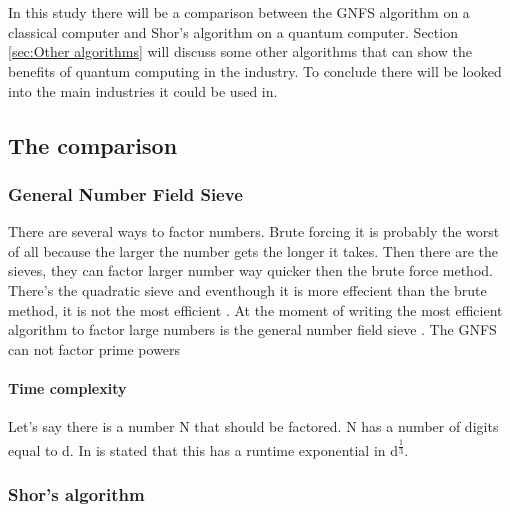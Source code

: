 
\chapter{}
\label{ch:onderzoek}



In this study there will be a comparison between the GNFS algorithm on a classical computer and Shor's algorithm on a quantum computer.
Section \ref{sec:Other algorithms} will discuss some other algorithms that can show the benefits of quantum computing in the industry. To conclude there will be looked into the main industries it could be used in.

\section{The comparison}
\subsection{General Number Field Sieve}
There are several ways to factor numbers. Brute forcing it is probably the worst of all because the larger the number gets the longer it takes. Then there are the sieves, they can factor larger number way quicker then the brute force method.
There's the quadratic sieve and eventhough it is more effecient than the brute method, it is not the most efficient \autocite{Quadratic_sieve}. At the moment of writing the most efficient algorithm to factor large numbers is the general number field sieve \autocite{shor_algo}.
The GNFS can not factor prime powers
\subsubsection{Time complexity}
Let's say there is a number N that should be factored. N has a number of digits equal to d. In \textcite{shor_algo} is stated that this has a runtime exponential in d\textsuperscript{$\frac{1}{3}$}.

\subsection{Shor's algorithm}
